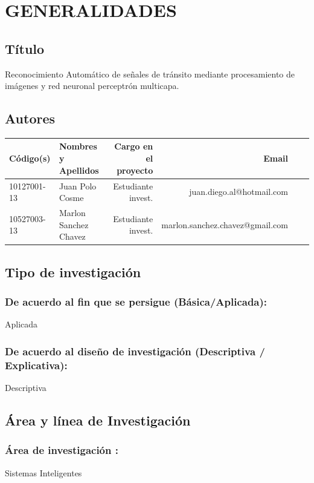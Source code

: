 \documentclass[a4paper, 12pt]{article}
\begin{document}
\section{GENERALIDADES}

\subsection{Título}
Reconocimiento Automático de señales de tránsito mediante procesamiento de imágenes y red neuronal perceptrón multicapa.
\subsection{Autores}
\begin{center}
\begin{table}[h!]
\centering
\begin{tabular}{llrrrr} \toprule
Código(s) & Nombres y Apellidos& Cargo en el proyecto&Email \\ \midrule
10127001-13 & Juan Polo Cosme & Estudiante invest. & juan.diego.al@hotmail.com           \\
10527003-13 & Marlon Sanchez Chavez & Estudiante invest. & marlon.sanchez.chavez@gmail.com            \\ \bottomrule
\end{tabular}
\end{table}
\end{center}



\subsection{Tipo de investigación}
\subsubsection{De acuerdo al fin que se persigue (Básica/Aplicada):} Aplicada
\subsubsection{De acuerdo al diseño de investigación (Descriptiva / Explicativa):} Descriptiva



\subsection{Área y línea de Investigación}
\subsubsection{Área de investigación :} Sistemas Inteligentes 
\end{document}
